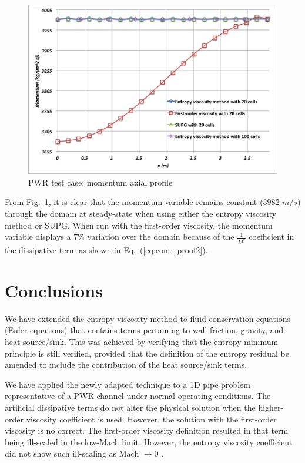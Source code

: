 \documentclass[12pt]{article}
\newcommand{\eqt}[1]{Eq.~(\ref{#1})} %
\newcommand{\fig}[1]{Fig.~\ref{#1}} %
\begin{document}
\begin{figure}[h]
\centering
\includegraphics[scale=0.4]{plots/Momentum.png}
\caption{PWR test case: momentum axial profile}
\label{fig:Momentum}
\end{figure}
From \fig{fig:Momentum}, it is clear that the momentum variable remains constant ($3982$ $m/s$) through the domain at steady-state when using either the entropy viscosity method or SUPG. When run with the first-order viscosity, the momentum variable displays a $7\%$ variation over the domain because of the $\frac{1}{M^*}$ coefficient in the dissipative term as shown in \eqt{eq:cont_proof2}.
%
\section{Conclusions} 
\label{sect::ccl}

We have extended the entropy viscosity method to fluid conservation equations (Euler equations) that contains terms pertaining to wall friction, gravity, and heat source/sink. This was achieved by verifying that the entropy minimum principle is still verified, provided that the definition of the entropy residual be amended to include the contribution of the heat source/sink terms. 

We have applied the newly adapted technique to a 1D pipe problem representative of a PWR channel under normal operating conditions. The artificial dissipative terms do not alter the physical solution when the higher-order viscosity coefficient is used. However, the solution with the first-order viscosity is no correct.
The first-order viscosity definition resulted in that term being ill-scaled in the low-Mach limit. However, the entropy viscosity coefficient did not show such ill-scaling as Mach $\rightarrow 0$ .
\end{document}
